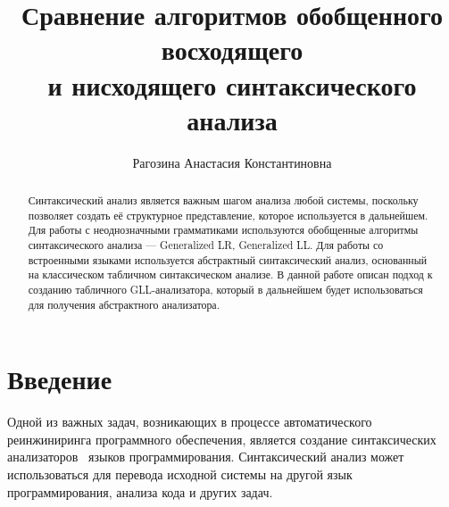 
\title{Сравнение алгоритмов обобщенного восходящего\\
и нисходящего синтаксического анализа}
%

\author{Рагозина Анастасия Константиновна}
%
%
%

\maketitle

\begin{abstract}
Синтаксический анализ является важным шагом анализа любой системы, поскольку позволяет создать её структурное представление, которое используется в дальнейшем. 
Для работы с неоднозначными грамматиками используются обобщенные алгоритмы синтаксического анализа --- Generalized LR, Generalized LL. Для работы со встроенными 
языками используется абстрактный синтаксический анализ, основанный на классическом табличном синтаксическом анализе. В данной работе описан подход к созданию табличного 
GLL-анализатора, который в дальнейшем будет использоваться для получения абстрактного анализатора.
\end{abstract}

\section*{Введение}
Одной из важных задач, возникающих в процессе автоматического реинжиниринга программного обеспечения, является создание синтаксических анализаторов~\cite{ulman} языков программирования. Синтаксический анализ может использоваться для перевода исходной системы на другой язык программирования, анализа кода и других задач.

